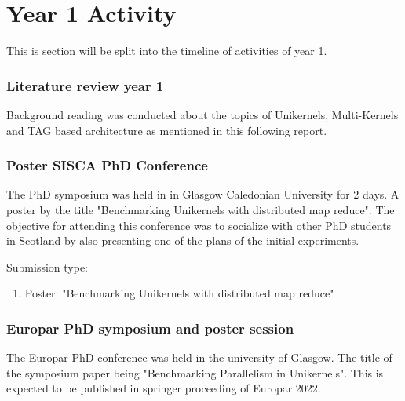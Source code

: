 
\chapter{Year 1 Activity}  %

\ifpdf
    \graphicspath{{Year1Activity/Figs/Raster/}{Year1Activity/Figs/PDF/}{Year1Activity/Figs/}}
\else
    \graphicspath{{Year1Activity/Figs/}{Year1Activity/Figs/}}
\fi

This is section will be split into the timeline of activities of year 1.

\subsection{Literature review year 1}
Background reading was conducted about the topics of Unikernels, Multi-Kernels and 
TAG based architecture as mentioned in this following report. 

\subsection{Poster SISCA PhD Conference}
The PhD symposium was held in in Glasgow Caledonian University for 2 days. A poster 
by the title "Benchmarking Unikernels with distributed map reduce"\cite{Sisca2022Poster}. The
objective for attending this conference was to socialize with other PhD students 
in Scotland by also presenting one of the plans of the initial experiments. 

Submission type:
\begin{enumerate}
    \item Poster: "Benchmarking Unikernels with distributed map reduce"\cite{Sisca2022Poster}
\end{enumerate}

\subsection{Europar PhD symposium and poster session}
The Europar PhD conference was held in the university of Glasgow. The title 
of the symposium paper being "Benchmarking Parallelism in Unikernels"\cite{Europar2022Paper}. This 
is expected to be published in springer proceeding of Europar 2022. 

